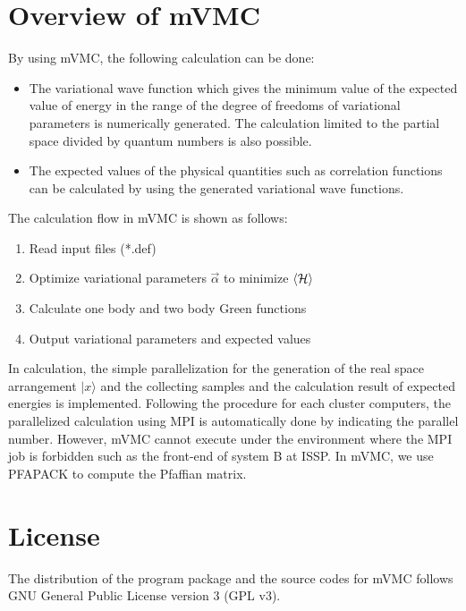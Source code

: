 \section{Overview of mVMC}
By using mVMC, the following calculation can be done:
\begin{itemize}
\item{The variational wave function which gives the minimum value of the expected value of energy in the range of the degree of freedoms of variational parameters is numerically generated. The calculation limited to the partial space divided by quantum numbers is also possible. }
\item{The expected values of the physical quantities such as correlation functions can be calculated by using the generated variational wave functions.}
\end{itemize}

The calculation flow in mVMC is shown as follows:
\begin{enumerate}
\item{Read input files (*.def)}
\item{Optimize variational parameters $\vec{\alpha}$ to minimize $\langle {\cal H} \rangle$}
\item{Calculate one body and two body Green functions}
\item{Output variational parameters and expected values}
\end{enumerate}
In calculation, the simple parallelization for the generation of the real space arrangement $|x\rangle$ and the collecting samples and the calculation result of expected energies is implemented. Following the procedure for each cluster computers, the parallelized calculation using MPI is automatically done by indicating the parallel number. However, mVMC cannot execute under the environment where the MPI job is forbidden such as the front-end of system B at ISSP. In mVMC, we use PFAPACK\cite{PFAPACK} to compute the Pfaffian matrix.

\section{License}
The distribution of the program package and the source codes for mVMC follows GNU General Public License version 3 (GPL v3). 

